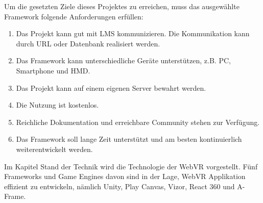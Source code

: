  Um die gesetzten Ziele dieses Projektes zu erreichen, muss das ausgewählte Framework folgende Anforderungen erfüllen:
 
 \begin{enumerate}
     \item Das Projekt kann gut mit LMS kommunizieren. Die Kommunikation kann durch URL oder Datenbank realisiert werden.
     \item Das Framework kann unterschiedliche Geräte unterstützen, z.B. PC, Smartphone und HMD.
     \item Das Projekt kann auf einem eigenen Server bewahrt werden.
     \item Die Nutzung ist kostenlos.
     \item Reichliche Dokumentation und erreichbare Community stehen zur Verfügung.
     \item Das Framework soll lange Zeit unterstützt und am besten kontinuierlich weiterentwickelt werden.
 \end{enumerate}
 
 Im Kapitel Stand der Technik wird die Technologie der WebVR vorgestellt. Fünf Frameworks und Game Engines davon sind in der Lage, WebVR Applikation effizient zu entwickeln, nämlich Unity, Play Canvas, Vizor, React 360 und A-Frame.
 
